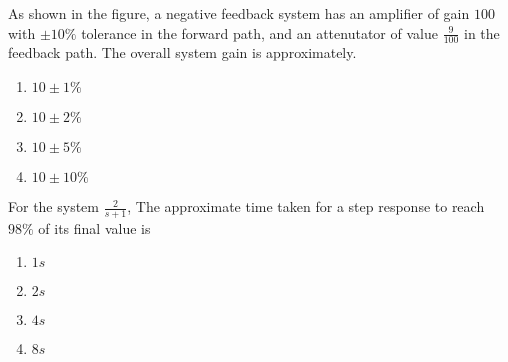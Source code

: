 \item{
As shown in the figure, a negative feedback system has an amplifier of gain $100$ with $\pm 10\%$ tolerance in the forward path, and an attenutator of value $\frac{9}{100}$ in the feedback path. The overall system gain is approximately.
\begin{figure}[H]
\centering
{}%

\label{fig:my_label}
\end{figure}
\begin{multicols}{4}
\begin{enumerate}
\item $10\pm 1\%$
\item $10\pm 2\%$
\item $10\pm 5\%$ 
\item $10\pm 10\%$
\end{enumerate}
\end{multicols}
}
\item{
For the system $\frac{2}{s+1}$, The approximate time taken for a step response to reach $98\%$ of its final value is
\begin{multicols}{4}
\begin{enumerate}
\item $1s$
\item $2s$
\item $4s$
\item $8s$
\end{enumerate}
\end{multicols}
}

